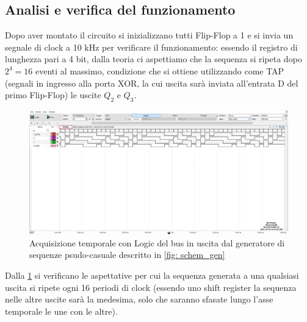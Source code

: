 \documentclass[10pt, a4paper, italian]{article}
\begin{document}
\subsection{Analisi e verifica del funzionamento}
Dopo aver montato il circuito si inizializzano tutti Flip-Flop a 1 e si invia un segnale di clock a 10 kHz per verificare il funzionamento: 
essendo il registro di lunghezza pari a 4 bit, dalla teoria ci aspettiamo che la sequenza si ripeta dopo $2^4 = 16$ eventi al massimo, condizione che si ottiene utilizzando come TAP (segnali in ingresso alla porta XOR, la cui uscita sarà inviata all'entrata D del primo Flip-Flop) le uscite $Q_2$ e $Q_3$. 

\begin{figure}[htbp]
\centering
	\includegraphics[width=\textwidth]{4.b}
	\caption{\label{fig: TAP_23}Acquisizione temporale con Logic del bus in uscita dal generatore di sequenze psudo-casuale descritto in \cref{fig: schem_gen}}
\end{figure}

Dalla \cref{fig: TAP_23} si verificano le aspettative per cui la sequenza generata a una qualsiasi uscita si ripete ogni 16 periodi di clock (essendo uno shift register la sequenza nelle altre uscite sarà la medesima, solo che saranno sfasate lungo l'asse temporale le une con le altre).
\end{document}
